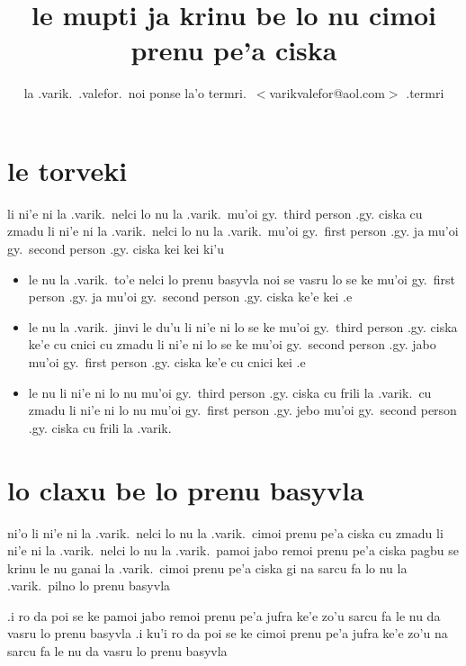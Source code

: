 \documentclass{article}
\title{le mupti ja krinu be lo nu cimoi prenu pe'a ciska}
\author{la .varik.\ .valefor.\ noi ponse la'o termri.\ $<$varikvalefor@aol.com$>$ .termri}
\begin{document}
\maketitle

\section{le torveki}
li ni'e ni la .varik.\ nelci lo nu la .varik.\ mu'oi gy.\ third person .gy. ciska cu zmadu li ni'e ni la .varik.\ nelci lo nu la .varik.\ mu'oi gy.\ first person .gy. ja mu'oi gy.\ second person .gy. ciska kei kei ki'u
\begin{itemize}
	\item le nu la .varik.\ to'e nelci lo prenu basyvla noi se vasru lo se ke mu'oi gy.\ first person .gy. ja mu'oi gy.\ second person .gy. ciska ke'e kei .e
	\item le nu la .varik.\ jinvi le du'u li ni'e ni lo se ke mu'oi gy.\ third person .gy. ciska ke'e cu cnici cu zmadu li ni'e ni lo se ke mu'oi gy.\ second person .gy. jabo mu'oi gy.\ first person .gy. ciska ke'e cu cnici kei .e
	\item le nu li ni'e ni lo nu mu'oi gy.\ third person .gy. ciska cu frili la .varik.\ cu zmadu li ni'e ni lo nu mu'oi gy.\ first person .gy. jebo mu'oi gy.\ second person .gy. ciska cu frili la .varik.
\end{itemize}

\section{lo claxu be lo prenu basyvla}
ni'o li ni'e ni la .varik.\ nelci lo nu la .varik.\ cimoi prenu pe'a ciska cu zmadu li ni'e ni la .varik.\ nelci lo nu la .varik.\ pamoi jabo remoi prenu pe'a ciska pagbu se krinu le nu ganai la .varik.\ cimoi prenu pe'a ciska gi na sarcu fa lo nu la .varik.\ pilno lo prenu basyvla

.i ro da poi se ke pamoi jabo remoi prenu pe'a jufra ke'e zo'u sarcu fa le nu da vasru lo prenu basyvla  .i ku'i ro da poi se ke cimoi prenu pe'a jufra ke'e zo'u na sarcu fa le nu da vasru lo prenu basyvla
\end{document}
